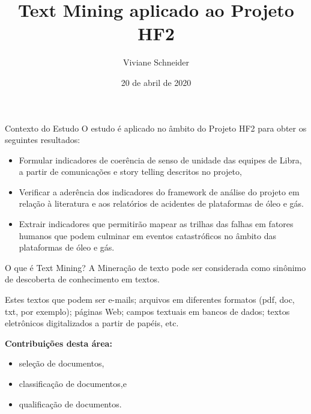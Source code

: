 \documentclass[
  ignorenonframetext,
]{beamer}
\title{Text Mining aplicado ao Projeto HF2}
\author{Viviane Schneider}
\date{20 de abril de 2020}
\begin{document}
\frame{\titlepage}

\begin{frame}{Contexto do Estudo}
\protect\hypertarget{contexto-do-estudo}{}
O estudo é aplicado no âmbito do Projeto HF2 para obter os seguintes
resultados:

\begin{itemize}[<+->]
\item
  Formular indicadores de coerência de senso de unidade das equipes de
  Libra, a partir de comunicações e story telling descritos no projeto,
\item
  Verificar a aderência dos indicadores do framework de análise do
  projeto em relação à literatura e aos relatórios de acidentes de
  plataformas de óleo e gás.
\item
  Extrair indicadores que permitirão mapear as trilhas das falhas em
  fatores humanos que podem culminar em eventos catastróficos no âmbito
  das plataformas de óleo e gás.
\end{itemize}
\end{frame}

\begin{frame}{O que é Text Mining?}
\protect\hypertarget{o-que-uxe9-text-mining}{}
A Mineração de texto pode ser considerada como sinônimo de descoberta de
conhecimento em textos.

Estes textos que podem ser e-mails; arquivos em diferentes formatos
(pdf, doc, txt, por exemplo); páginas Web; campos textuais em bancos de
dados; textos eletrônicos digitalizados a partir de papéis, etc.

\textbf{Contribuições desta área:}

\begin{itemize}[<+->]
\item
  seleção de documentos,
\item
  classiﬁcação de documentos,e
\item
  qualiﬁcação de documentos.
\end{itemize}
\end{frame}
\end{document}
